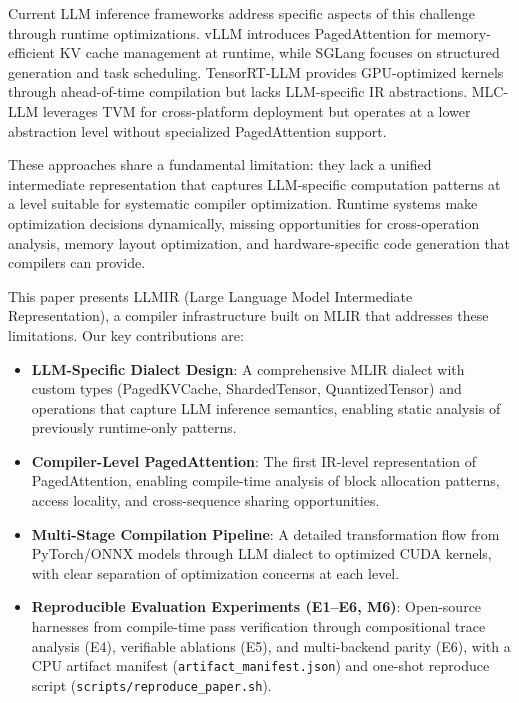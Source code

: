 \documentclass[conference]{IEEEtran}
\begin{document}
Current LLM inference frameworks address specific aspects of this challenge through runtime optimizations. vLLM \cite{b3} introduces PagedAttention for memory-efficient KV cache management at runtime, while SGLang \cite{b4} focuses on structured generation and task scheduling. TensorRT-LLM \cite{b10} provides GPU-optimized kernels through ahead-of-time compilation but lacks LLM-specific IR abstractions. MLC-LLM \cite{b15} leverages TVM for cross-platform deployment but operates at a lower abstraction level without specialized PagedAttention support.

These approaches share a fundamental limitation: they lack a unified intermediate representation that captures LLM-specific computation patterns at a level suitable for systematic compiler optimization. Runtime systems make optimization decisions dynamically, missing opportunities for cross-operation analysis, memory layout optimization, and hardware-specific code generation that compilers can provide.

This paper presents LLMIR (Large Language Model Intermediate Representation), a compiler infrastructure built on MLIR \cite{b5} that addresses these limitations. Our key contributions are:

\begin{itemize}
    \item \textbf{LLM-Specific Dialect Design}: A comprehensive MLIR dialect with custom types (PagedKVCache, ShardedTensor, QuantizedTensor) and operations that capture LLM inference semantics, enabling static analysis of previously runtime-only patterns.
    
    \item \textbf{Compiler-Level PagedAttention}: The first IR-level representation of PagedAttention, enabling compile-time analysis of block allocation patterns, access locality, and cross-sequence sharing opportunities.
    
    \item \textbf{Multi-Stage Compilation Pipeline}: A detailed transformation flow from PyTorch/ONNX models through LLM dialect to optimized CUDA kernels, with clear separation of optimization concerns at each level.
    
    \item \textbf{Reproducible Evaluation Experiments (E1--E6, M6)}: Open-source harnesses from compile-time pass verification through compositional trace analysis (E4), verifiable ablations (E5), and multi-backend parity (E6), with a CPU artifact manifest (\texttt{artifact\_manifest.json}) and one-shot reproduce script (\texttt{scripts/reproduce\_paper.sh}).
\end{itemize}
\end{document}
